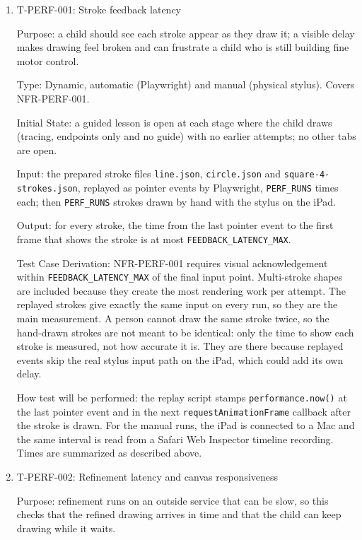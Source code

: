 \documentclass[12pt, titlepage]{article}
\newcommand{\testitem}[1]{\item #1\par\nopagebreak}
\begin{document}
\begin{enumerate}

\testitem{T-PERF-001: Stroke feedback latency}

Purpose: a child should see each stroke appear as they draw it; a visible delay makes drawing feel broken and can frustrate a child who is still building fine motor control.

Type: Dynamic, automatic (Playwright) and manual (physical stylus). Covers NFR-PERF-001.

Initial State: a guided lesson is open at each stage where the child draws
(tracing, endpoints only and no guide) with no earlier
attempts; no other tabs are open.

Input: the prepared stroke files \texttt{line.json}, \texttt{circle.json}
and \texttt{square-\allowbreak{}4-\allowbreak{}strokes.json}, replayed as pointer events by
Playwright, \texttt{PERF\_RUNS} times each; then \texttt{PERF\_RUNS}
strokes drawn by hand with the stylus on the iPad.

Output: for every stroke, the time from the last pointer event to the first
frame that shows the stroke is at most \texttt{FEEDBACK\_LATENCY\_MAX}.

Test Case Derivation: NFR-PERF-001 requires visual acknowledgement within
\texttt{FEEDBACK\_LATENCY\_MAX} of the final input point. Multi-stroke
shapes are included because they create the most rendering work per
attempt. The replayed strokes give exactly the same input on every run, so
they are the main measurement. A person cannot draw the same stroke twice,
so the hand-drawn strokes are not meant to be identical: only the time to
show each stroke is measured, not how accurate it is. They are there
because replayed events skip the real stylus input path on the iPad, which
could add its own delay.

How test will be performed: the replay script stamps
\texttt{performance.\allowbreak now()} at the last pointer event and in the next
\texttt{request\allowbreak Animation\allowbreak Frame} callback after the stroke is drawn. For the
manual runs, the iPad is connected to a Mac and the same interval is read
from a Safari Web Inspector timeline recording. Times are summarized as
described above.

\testitem{T-PERF-002: Refinement latency and canvas responsiveness}

Purpose: refinement runs on an outside service that can be slow, so this checks that the refined drawing arrives in time and that the child can keep drawing while it waits.


\end{enumerate}
\end{document}
